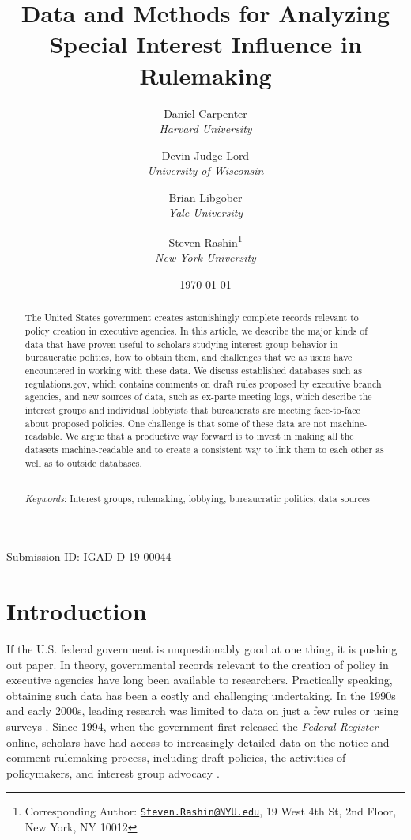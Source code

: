 \documentclass[
      12pt,
        ]{article}
\title{Data and Methods for Analyzing Special Interest Influence in Rulemaking}
\author{ %
            Daniel Carpenter  \\ \emph{Harvard University}
             \and
            Devin Judge-Lord  \\ \emph{University of Wisconsin}
             \and
            Brian Libgober  \\ \emph{Yale University}
             \and
            Steven Rashin\footnote{Corresponding Author:
\href{mailto:Steven.Rashin@NYU.edu}{\nolinkurl{Steven.Rashin@NYU.edu}},
19 West 4th St, 2nd Floor, New York, NY 10012}  \\ \emph{New York University}
            }
\date{\today}
\begin{document}

  \maketitle




  \begin{abstract}
    \noindent The United States government creates astonishingly complete records
relevant to policy creation in executive agencies. In this article, we
describe the major kinds of data that have proven useful to scholars
studying interest group behavior in bureaucratic politics, how to obtain
them, and challenges that we as users have encountered in working with
these data. We discuss established databases such as regulations.gov,
which contains comments on draft rules proposed by executive branch
agencies, and new sources of data, such as ex-parte meeting logs, which
describe the interest groups and individual lobbyists that bureaucrats
are meeting face-to-face about proposed policies. One challenge is that
some of these data are not machine-readable. We argue that a productive
way forward is to invest in making all the datasets machine-readable and
to create a consistent way to link them to each other as well as to
outside databases.

          \hfill \\
      \noindent \emph{Keywords}: Interest groups, rulemaking, lobbying, bureaucratic politics, data
sources

  \end{abstract}









  \newpage

\noindent
      \doublespacing
    \noindent Submission ID: IGAD-D-19-00044

\hypertarget{introduction}{%
\section{Introduction}\label{introduction}}

If the U.S. federal government is unquestionably good at one thing, it
is pushing out paper. In theory, governmental records relevant to the
creation of policy in executive agencies have long been available to
researchers. Practically speaking, obtaining such data has been a costly
and challenging undertaking. In the 1990s and early 2000s, leading
research was limited to data on just a few rules
\citep[e.g.,][]{GoldenJPART1998} or using surveys
\citep[e.g.,][]{FurlongJPART2004}. Since 1994, when the government first
released the \emph{Federal Register} online, scholars have had access to
increasingly detailed data on the notice-and-comment rulemaking process,
including draft policies, the activities of policymakers, and interest
group advocacy \citep[see][ for a recent review]{Yackee2019}.
\end{document}
